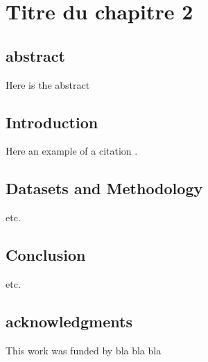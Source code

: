 \chapter{Titre du chapitre 2}



\section{abstract}

Here is the abstract

\section{Introduction}
\label{sec:intro}

Here an example of a citation \citep{Someauthor2013}.

\section{Datasets and Methodology}
\label{sec:method}

etc.

\section{Conclusion}

etc.



\section{acknowledgments}
This work was funded by bla bla bla


%    
%   




